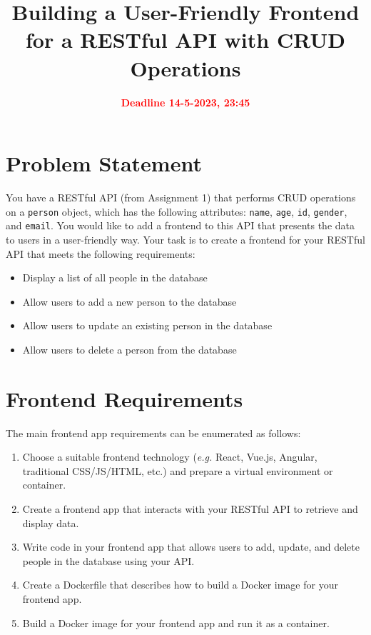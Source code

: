 \documentclass{article}
\title{Building a User-Friendly Frontend for a RESTful API with CRUD Operations}
\date{\textbf{\textcolor{red}{Deadline 14-5-2023, 23:45}}}
\begin{document}
\maketitle

\section*{Problem Statement}
You have a RESTful API (from Assignment 1) that performs CRUD operations on a \texttt{person} object, which has the following attributes: \texttt{name}, \texttt{age}, \texttt{id}, \texttt{gender}, and \texttt{email}. You would like to add a frontend to this API that presents the data to users in a user-friendly way.
Your task is to create a frontend for your RESTful API that meets the following requirements:

\begin{itemize}
	\item Display a list of all people in the database
	\item Allow users to add a new person to the database
	\item Allow users to update an existing person in the database
	\item Allow users to delete a person from the database
\end{itemize}


\section*{Frontend Requirements}
The main frontend app requirements can be enumerated as follows:

\begin{enumerate}
	\item Choose a suitable frontend technology (\textit{e.g.} React, Vue.js, Angular, traditional CSS/JS/HTML, etc.) and prepare a virtual environment or container.
	\item Create a frontend app that interacts with your RESTful API to retrieve and display data.
	\item Write code in your frontend app that allows users to add, update, and delete people in the database using your API.
	\item Create a Dockerfile that describes how to build a Docker image for your frontend app.
	\item Build a Docker image for your frontend app and run it as a container.
\end{enumerate}

\end{document}

